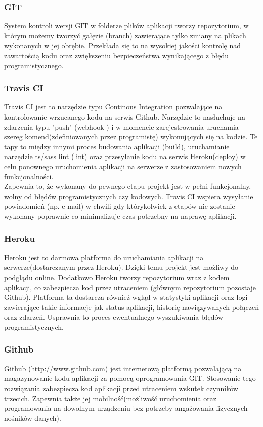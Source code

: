 \documentclass[eng,printmode]{mgr}
\begin{document}
\subsubsection{GIT}
System kontroli wersji GIT \cite {GIT} w folderze plików aplikacji tworzy repozytorium, w którym możemy tworzyć gałęzie (branch) zawierające tylko zmiany na plikach wykonanych w jej obrębie. Przekłada się to na wysokiej jakości kontrolę nad zawartością kodu oraz zwiększeniu bezpieczeństwa wynikającego z błędu programistycznego. 

\subsubsection{Travis CI}
Travis CI \cite {TRAVIS} jest to narzędzie typu Continous Integration \cite {CI} pozwalające na kontrolowanie wrzucanego kodu na serwis Github. Narzędzie to nasłuchuje na zdarzenia typu "push" (webhook \cite {webhook}) i w momencie zarejestrowania uruchamia szereg komend(zdefiniowanych przez programistę) wykonujących się na kodzie. Te tapy to między innymi proces budowania aplikacji (build), uruchamianie narzędzie ts/sass lint (lint) oraz przesyłanie kodu na serwis Heroku(deploy) w celu ponownego uruchomienia aplikacji na serwerze z zastosowaniem nowych funkcjonalności. \\
Zapewnia to, że wykonany do pewnego etapu projekt jest w pełni funkcjonalny, wolny od błędów programistycznych czy kodowych. Travis CI wspiera wysyłanie powiadomień (np. e-mail) w chwili gdy którykolwiek z etapów nie zostanie wykonany poprawnie co minimalizuje czas potrzebny na naprawę aplikacji.

\subsubsection{Heroku}
Heroku \cite{Heroku} jest to darmowa platforma do uruchamiania aplikacji na serwerze(dostarczanym przez Heroku). Dzięki temu projekt jest możliwy do podglądu online. Dodatkowo Heroku tworzy repozytorium wraz z kodem aplikacji, co zabezpiecza kod przez utraceniem (głównym repozytorium pozostaje Github). Platforma ta dostarcza również wgląd w statystyki aplikacji oraz logi zawierające takie informacje jak status aplikacji, historię nawiązywanych połączeń oraz zdarzeń. Usprawnia to proces ewentualnego wyszukiwania błędów programistycznych.

\subsubsection{Github}
Github (http://www.github.com) jest internetową platformą pozwalającą na magazynowanie kodu aplikacji za pomocą oprogramowania GIT. Stosowanie tego rozwiązania zabezpiecza kod aplikacji przed utraceniem wskutek czynników trzecich. Zapewnia także jej mobilność(możliwość uruchomienia oraz programowania na dowolnym urządzeniu bez potrzeby angażowania fizycznych nośników danych).
\end{document}

